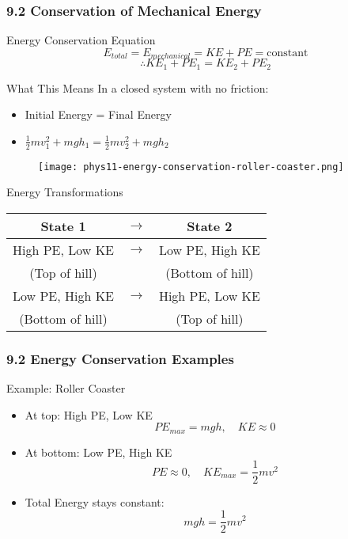 \documentclass{beamer}
\begin{document}
\begin{frame}
\frametitle{9.2 Conservation of Mechanical Energy}
\begin{block}{Energy Conservation Equation}
$$E_{total} = E_{mechanical} = KE + PE = \text{constant}$$
$$\therefore KE_1 + PE_1 = KE_2 + PE_2$$
\end{block}

\begin{alertblock}{What This Means}
In a closed system with no friction:
\begin{itemize}
\item Initial Energy = Final Energy
\item $\frac{1}{2}mv_1^2 + mgh_1 = \frac{1}{2}mv_2^2 + mgh_2$
\end{itemize}
\end{alertblock}
\end{frame}

\begin{frame}
\begin{figure}
    \centering
    \texttt{[image: phys11-energy-conservation-roller-coaster.png]}
\end{figure}
\begin{block}{Energy Transformations}
\begin{center}
\begin{tabular}{c c c}
\textbf{State 1} & $\rightarrow$ & \textbf{State 2} \\
\hline
High PE, Low KE & $\rightarrow$ & Low PE, High KE \\
(Top of hill) & & (Bottom of hill) \\[1em]
Low PE, High KE & $\rightarrow$ & High PE, Low KE \\
(Bottom of hill) & & (Top of hill)
\end{tabular}
\end{center}
\end{block}
\end{frame}

\begin{frame}
\frametitle{9.2 Energy Conservation Examples}
\begin{block}{Example: Roller Coaster}
\begin{itemize}
\item At top: High PE, Low KE
 $$PE_{max} = mgh, \quad KE \approx 0$$
\item At bottom: Low PE, High KE
 $$PE \approx 0, \quad KE_{max} = \frac{1}{2}mv^2$$
\item Total Energy stays constant:
 $$mgh = \frac{1}{2}mv^2$$
\end{itemize}
\end{block}
\end{frame}
\end{document}
